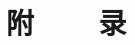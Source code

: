 \appendix



\section*{附\ \ \ \ 录\ \ \ }


\renewcommand{\thesubsection}{附录\Alph{subsection}}

\newcommand{\appendsection}[1]{\titleformat*{\subsection}{\centering}\zihao{-4}\heiti\subsection{} {\centering\paragraph{#1}\mbox{}\\}\songti}
\newcommand{\appendchn}[1]{\titleformat*{\subsection}{\centering}\zihao{-4}\heiti\subsection*{中文译文\Alph{subsection}} {\centering\paragraph{#1}\mbox{}\\}\songti}




